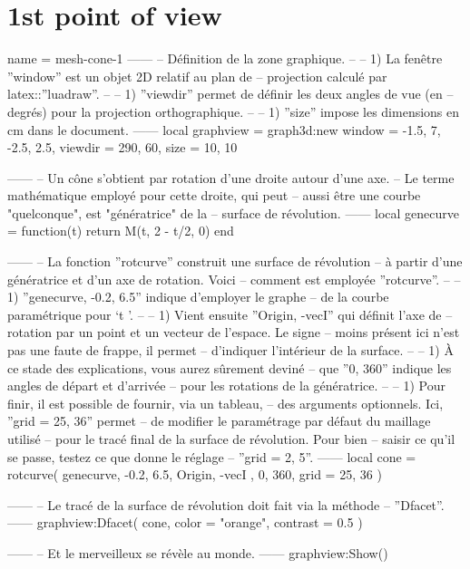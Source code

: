 \documentclass[varwidth]{standalone}
\begin{document}
\section*{1st point of view}

\begin{luadraw}{name = mesh-cone-1}
------
-- Définition de la zone graphique.
--
--     1) La fenêtre ''window'' est un objet 2D relatif au plan de
--     projection calculé par latex::''luadraw''.
--
--     1) ''viewdir'' permet de définir les deux angles de vue (en
--     degrés) pour la projection orthographique.
--
--     1) ''size'' impose les dimensions en cm dans le document.
------
local graphview = graph3d:new{
  window  = {-1.5, 7, -2.5, 2.5},
  viewdir = {290, 60},
  size    = {10, 10}
}

------
-- Un cône s'obtient par rotation d'une droite autour d'une axe.
-- Le terme mathématique employé pour cette droite, qui peut
-- aussi être une courbe "quelconque", est "génératrice" de la
-- surface de révolution.
------
local genecurve = function(t)
  return M(t, 2 - t/2, 0)
end

------
-- La fonction ''rotcurve'' construit une surface de révolution
-- à partir d'une génératrice et d'un axe de rotation. Voici
-- comment est employée ''rotcurve''.
--
--     1) ''genecurve, -0.2, 6.5'' indique d'employer le graphe
--     de la courbe paramétrique pour `t \in [-0.2 .. 6.5]'.
--
--     1) Vient ensuite ''{Origin, -vecI}'' qui définit l'axe de
--     rotation par un point et un vecteur de l'espace. Le signe
--     moins présent ici n'est pas une faute de frappe, il permet
--     d'indiquer l'intérieur de la surface.
--
--     1) À ce stade des explications, vous aurez sûrement deviné
--     que ''0, 360'' indique les angles de départ et d'arrivée
--     pour les rotations de la génératrice.
--
--     1) Pour finir, il est possible de fournir, via un tableau,
--     des arguments optionnels. Ici, ''grid = {25, 36}'' permet
--     de modifier le paramétrage par défaut du maillage utilisé
--     pour le tracé final de la surface de révolution. Pour bien
--     saisir ce qu'il se passe, testez ce que donne le réglage
--     ''grid = {2, 5}''.
------
local cone = rotcurve(
  genecurve, -0.2, 6.5,
  {
    Origin, -vecI
  },
  0, 360,
  {
    grid = {25, 36}
  })

------
-- Le tracé de la surface de révolution doit fait via la méthode
-- ''Dfacet''.
------
graphview:Dfacet(
  cone,
  {
    color  = "orange",
    contrast = 0.5
  })

------
-- Et le merveilleux se révèle au monde.
------
graphview:Show()
\end{luadraw}
\end{document}
